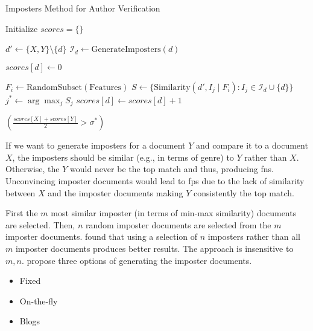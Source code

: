 \begin{algorithm}
    \caption{Imposters Method for Author Verification}
    \label{alg:imposter_algo}
    \begin{algorithmic}[1]
    
        \State Initialize $scores = \{\}$ 
    
            \State $d' \gets \{X, Y\} \setminus \{d\}$ 
            \State $\mathcal{I}_d \gets \text{GenerateImposters}(d)$ 
    
            \State $scores[d] \gets 0$ 
    
                \State $F_i \gets \text{RandomSubset}(\text{Features})$ 
                \State $S \gets \{ \text{Similarity}(d', I_j \mid F_i) : I_j \in \mathcal{I}_d \cup \{d\} \}$ 
                \State $j^* \gets \arg\max_j S_j$ 
                 
                    \State $scores[d] \gets scores[d] + 1$ 

                \EndIf
            \EndFor
        \EndFor
    
        \State \Return $\left( \frac{scores[X] + scores[Y]}{2} > \sigma^* \right)$ 
    \EndProcedure
    \end{algorithmic}
    \end{algorithm}
    
If we want to generate imposters for a document $Y$ and compare it to a document $X$, 
the imposters should be similar (e.g., in terms of genre) to $Y$ rather than $X$.
Otherwise, the $Y$ would never be the top match and thus, producing \acp{fn}.
Unconvincing imposter documents would lead to \acp{fp} due to the lack of similarity between $X$ and the imposter documents making $Y$ consistently the top match.

First the $m$ most similar imposter (in terms of min-max similarity) documents are selected.
Then, $n$ random imposter documents are selected from the $m$ imposter documents.
\citet{koppel_determining_2014} found that using a selection of $n$ imposters rather than all $m$ imposter documents produces better results.
The approach is insensitive to $m,n$.
\citet{koppel_determining_2014} propose three options of generating the imposter documents.
\begin{itemize}
    \item Fixed
    \item On-the-fly
    \item Blogs
\end{itemize}

